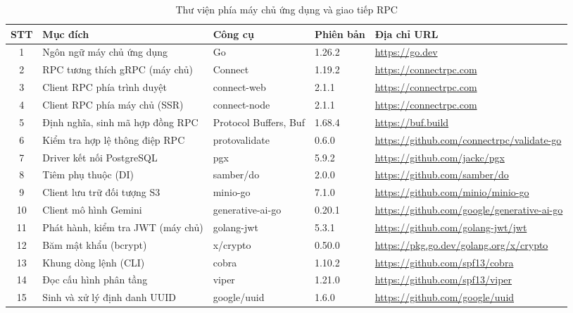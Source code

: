 \documentclass[../DoAn.tex]{subfiles}
\begin{document}
\begin{table}[H]
\centering
\small
\begin{tabular}{|c|p{3.2cm}|p{2.5cm}|p{2cm}|p{3.3cm}|}
\hline
\textbf{STT} & \textbf{Mục đích} & \textbf{Công cụ} & \textbf{Phiên bản} & \textbf{Địa chỉ URL} \\ \hline
1 & Ngôn ngữ máy chủ ứng dụng & Go & 1.26.2 & \url{https://go.dev} \\ \hline
2 & RPC tương thích gRPC (máy chủ) & Connect & 1.19.2 & \url{https://connectrpc.com} \\ \hline
3 & Client RPC phía trình duyệt & connect-web & 2.1.1 & \url{https://connectrpc.com} \\ \hline
4 & Client RPC phía máy chủ (SSR) & connect-node & 2.1.1 & \url{https://connectrpc.com} \\ \hline
5 & Định nghĩa, sinh mã hợp đồng RPC & Protocol Buffers, Buf & 1.68.4 & \url{https://buf.build} \\ \hline
6 & Kiểm tra hợp lệ thông điệp RPC & protovalidate & 0.6.0 & \url{https://github.com/connectrpc/validate-go} \\ \hline
7 & Driver kết nối PostgreSQL & pgx & 5.9.2 & \url{https://github.com/jackc/pgx} \\ \hline
8 & Tiêm phụ thuộc (DI) & samber/do & 2.0.0 & \url{https://github.com/samber/do} \\ \hline
9 & Client lưu trữ đối tượng S3 & minio-go & 7.1.0 & \url{https://github.com/minio/minio-go} \\ \hline
10 & Client mô hình Gemini & generative-ai-go & 0.20.1 & \url{https://github.com/google/generative-ai-go} \\ \hline
11 & Phát hành, kiểm tra JWT (máy chủ) & golang-jwt & 5.3.1 & \url{https://github.com/golang-jwt/jwt} \\ \hline
12 & Băm mật khẩu (bcrypt) & x/crypto & 0.50.0 & \url{https://pkg.go.dev/golang.org/x/crypto} \\ \hline
13 & Khung dòng lệnh (CLI) & cobra & 1.10.2 & \url{https://github.com/spf13/cobra} \\ \hline
14 & Đọc cấu hình phân tầng & viper & 1.21.0 & \url{https://github.com/spf13/viper} \\ \hline
15 & Sinh và xử lý định danh UUID & google/uuid & 1.6.0 & \url{https://github.com/google/uuid} \\ \hline
\end{tabular}
\caption{Thư viện phía máy chủ ứng dụng và giao tiếp RPC}
\label{tbl:tools2}
\end{table}
\end{document}

